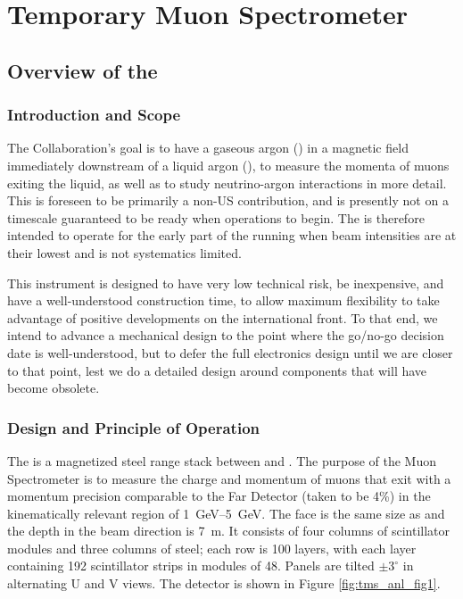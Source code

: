 \chapter{Temporary Muon Spectrometer}
\label{ch:tms}



\section{Overview of the }
\label{sec:tms-ovvw}

\subsection{Introduction and Scope}
\label{sec:tms-ovvw-intro}

The  Collaboration's goal is to have a gaseous argon  () in a magnetic field immediately downstream of a liquid argon (), to measure the momenta of muons exiting the liquid, as well as to study neutrino-argon interactions in more detail. This is foreseen to be primarily a non-US contribution, and is presently not on a timescale guaranteed to be ready when  operations to begin. The  is therefore intended to operate for the early part of the running when beam intensities are at their lowest and  is not systematics limited.

This instrument is designed to have very low technical risk, be inexpensive, and have a well-understood construction time, to allow maximum flexibility to take advantage of positive developments on the international front. To that end, we intend to advance a mechanical design to the point where the go/no-go decision date is well-understood, but to defer the full electronics design until we are closer to that point, lest we do a detailed design around components that will have become obsolete.

\subsection{Design and Principle of Operation}
\label{sec:tms-ovvw-op}

The  is a magnetized steel range stack between  and . The purpose of the Muon Spectrometer is to measure the charge and momentum of muons that exit  with a momentum precision comparable to the Far Detector (taken to be 4\%) in the kinematically relevant region of  \SIrange{1}{5}{\GeV}.  The face is the same size as  and the depth in the beam direction is \SI{7}{\m}.  It consists of four columns of scintillator modules and three columns of steel; each row is \num{100} layers, with each layer containing \num{192} scintillator strips in modules of \num{48}. Panels are tilted $\pm 3^{\circ}$ in alternating U and V views. The detector is shown in Figure \ref{fig:tms_anl_fig1}. 


